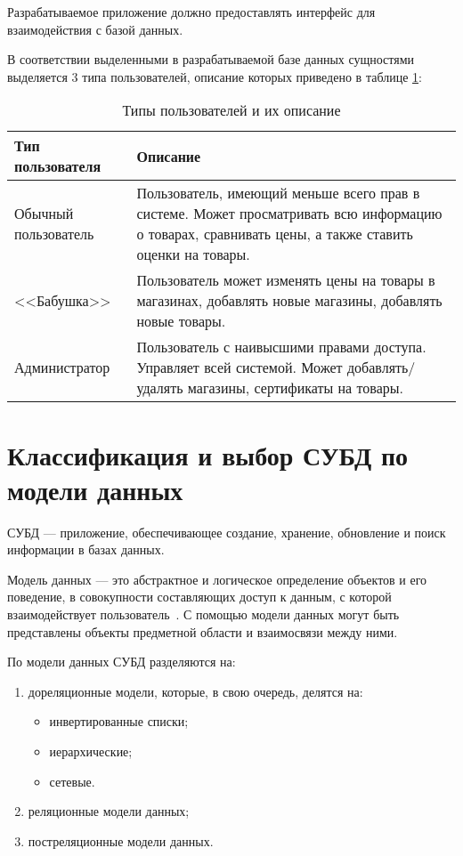 Разрабатываемое приложение должно предоставлять интерфейс для взаимодействия с базой данных. 

В соответствии выделенными в разрабатываемой базе данных сущностями выделяется 3 типа пользователей, описание которых приведено в таблице \ref{tbl:db_roles}:


\begin{table}[ht]
	\begin{center}
		\begin{threeparttable}
			\caption{Типы пользователей и их описание}
			\label{tbl:db_roles}
			\begin{tabular}{|p{4.5cm}|p{10cm}|}
				\hline
				\textbf{Тип пользователя} & \textbf{Описание} \\ \hline
				Обычный пользователь & Пользователь, имеющий меньше всего прав в системе. Может просматривать всю информацию о товарах, сравнивать цены, а также ставить оценки на товары. \\
				\hline
				<<Бабушка>> & Пользователь может изменять цены на товары в магазинах, добавлять новые магазины, добавлять новые товары. \\ 
				\hline
				Администратор & Пользователь с наивысшими правами доступа. Управляет всей системой. Может добавлять/удалять магазины, сертификаты на товары. \\ 
				\hline
			\end{tabular}
		\end{threeparttable}
	\end{center}
\end{table}


\section{Классификация и выбор СУБД по модели данных}

СУБД --- приложение, обеспечивающее создание, хранение, обновление и поиск информации в базах данных.

Модель данных --- это абстрактное и логическое определение объектов и его поведение, в совокупности составляющих доступ к данным, с которой взаимодействует пользователь~\cite{info_intro_db_williams}. С помощью модели данных могут быть представлены объекты предметной области и взаимосвязи между ними.

По модели данных СУБД разделяются на:

\begin{enumerate}[label={\arabic*)}]
	\item дореляционные модели, которые, в свою очередь, делятся на:
	\begin{itemize}[label*=--]
		\item инвертированные списки;
		\item иерархические;
		\item сетевые.
	\end{itemize}
	\item реляционные модели данных;
	\item постреляционные модели данных.
\end{enumerate}

